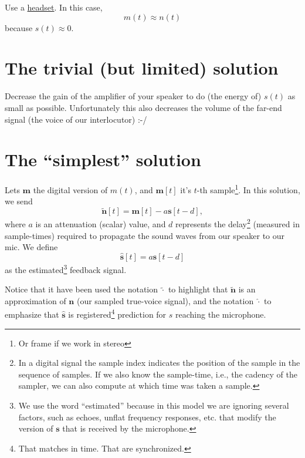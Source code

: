 Use a \href{https://en.wikipedia.org/wiki/Audio_headset}{headset}. In
this case,
\begin{equation}
  m(t) \approx n(t)
  \label{eq:headset_solution}
\end{equation}
because $s(t)\approx 0$.

\section{The trivial (but limited) solution}

Decrease the gain of the amplifier of your speaker to do (the energy
of) $s(t)$ as small as possible. Unfortunately this also decreases the
volume of the far-end signal (the voice of our interlocutor) :-/

\section{The ``simplest'' solution}
Lets ${\mathbf m}$ the digital version of $m(t)$, and ${\mathbf m}[t]$
it's $t$-th sample\footnote{Or frame if we work in stereo}. In this
solution, we send
\begin{equation}
  \tilde{\mathbf n}[t] = {\mathbf m}[t] - a{\mathbf s}[t-d],
  \label{eq:simplest}
\end{equation}
where $a$ is an attenuation (scalar) value, and $d$ represents the
delay\footnote{In a digital signal the sample index indicates the
  position of the sample in the sequence of samples. If we also know
  the sample-time, i.e., the cadency of the sampler, we can also
  compute at which time was taken a sample.} (measured in
sample-times) required to propagate the sound waves from our speaker
to our mic. We define
\begin{equation}
  \hat{\mathbf s}[t] = a{\mathbf s}[t-d]
  \label{eq:minimal_filter}
\end{equation}
as the estimated\footnote{We use the word ``estimated'' because in
  this model we are ignoring several factors, such as echoes, unflat
  frequency responses, etc.  that modify the version of $\mathbf{s}$
  that is received by the microphone.} feedback signal.

Notice that it have been used the notation $\tilde{\cdot}$ to highlight
that $\tilde{\mathbf n}$ is an approximation of ${\mathbf n}$ (our
sampled true-voice signal), and the notation $\hat{\cdot}$ to
emphasize that $\hat{\mathbf s}$ is registered\footnote{That matches
  in time. That are synchronized.} prediction for $s$
reaching the microphone.

